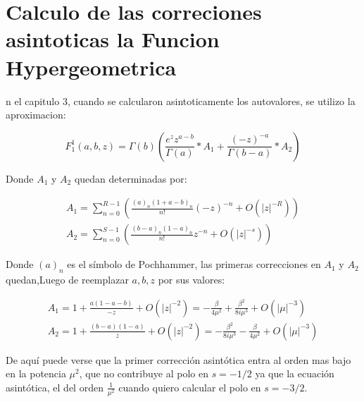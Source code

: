 \chapter{Calculo de las correciones asintoticas la Funcion Hypergeometrica}

n el capitulo 3, cuando se calcularon asintoticamente los autovalores, se utilizo la aproximacion:  

\begin{equation}
    F _1 ^1 (a,b,z) = \Gamma (b) 
    \left(
    \frac{e^z z ^{a-b} }{\Gamma(a)} * A_1 + \frac{(-z) ^{ -a}}{ \Gamma(b-a)} 
    * A_2
    \right)
\end{equation}

Donde $A_1$ y $A_2$ quedan determinadas por:

\begin{equation}
\begin{array}{c}
    A _1 = 
    \sum _{n=0} ^{R-1} 
    \left(
    \frac{(a) _n (1+a-b) _n}{n!} (-z) ^{-n} + O(|z| ^{-R})
    \right) \\
    A _2 = 
    \sum _{n=0} ^{S-1} 
    \left(
    \frac{(b-a) _n (1-a) _n }{n!} z ^{-n} + O(|z| ^{-s})
    \right)
\end{array}
\end{equation}

Donde $(a)_ n$ es el símbolo de Pochhammer, las primeras correcciones en $A_1$ y $A_2$ quedan,Luego de reemplazar $a,b,z$ por sus valores:

\begin{equation}
\begin{array}{c}
    A _1 = 1 + \frac{a(1-a-b)}{-z} + O(|z| ^ {-2})
    =  - \frac{\beta}{4 \mu ^2} + \frac{\beta ^2}{8 i \mu ^3} + O(|\mu| ^{-3}) \\ 
    A _2 = 1 + \frac{(b-a)(1-a)}{z} + O(|z| ^{-2}) = 
    - \frac{\beta ^2}{8 i \mu ^3} - \frac{\beta}{4 \mu ^2} + 
    O(|\mu| ^{-3})
\end{array}
\end{equation}

De aquí puede verse que la primer corrección asintótica entra al orden mas bajo en la potencia $\mu ^2$, que no contribuye al polo en $s= -1/2$ ya que la ecuación asintótica, el del orden $\frac{1}{\mu ^2}$ cuando quiero calcular el polo en $s=-3/2$.
